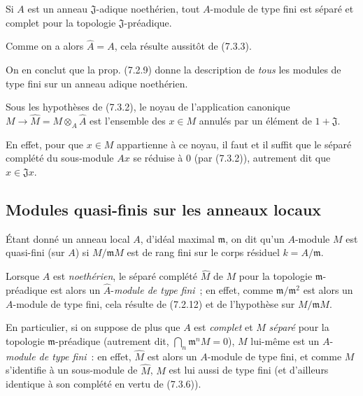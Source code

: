 \begin{corollary}[7.3.6]
\label{0.7.3.6-fr}
Si $A$ est un anneau $\mathfrak J$-adique noethérien, tout $A$-module de type
fini est séparé et complet pour la topologie $\mathfrak J$-préadique.
\end{corollary}

Comme on a alors $\widehat A=A$, cela résulte aussitôt de (7.3.3).

On en conclut que la prop. (7.2.9) donne la description de \emph{tous} les
modules de type fini sur un anneau adique noethérien.

\begin{corollary}[7.3.7]
\label{0.7.3.7-fr}
Sous les hypothèses de \textup{(7.3.2)}, le noyau de l'application canonique
$M\to\widehat M=M\otimes_A\widehat A$ est l'ensemble des $x\in M$ annulés par
un élément de $1+\mathfrak J$.
\end{corollary}

En effet, pour que $x\in M$ appartienne à ce noyau, il faut et il suffit que
le séparé complété du sous-module $Ax$ se réduise à 0 (par (7.3.2)), autrement
dit que $x\in\mathfrak Jx$.

\subsection{Modules quasi-finis sur les anneaux locaux}
\label{subsection:0.7.4-fr}

\begin{definition}[7.4.1]
\label{0.7.4.1-fr}
Étant donné un anneau local $A$, d'idéal maximal $\mathfrak m$, on dit qu'un
$A$-module $M$ est quasi-fini (sur $A$) si $M/\mathfrak mM$ est de rang fini
sur le corps résiduel $k=A/\mathfrak m$.
\end{definition}

Lorsque $A$ est \emph{noethérien}, le séparé complété $\widehat M$ de $M$ pour la
topologie $\mathfrak m$-préadique est alors un
$\widehat A$-\emph{module de type fini}~; en effet, comme
$\mathfrak m/\mathfrak m^2$ est alors un $A$-module de type fini, cela résulte
de (7.2.12) et de l'hypothèse sur $M/\mathfrak mM$.

En particulier, si on suppose de plus que $A$ est \emph{complet} et $M$
\emph{séparé} pour la topologie $\mathfrak m$-préadique (autrement dit,
$\bigcap_n\mathfrak m^nM=0$), $M$ lui-même est un
$A$-\emph{module de type fini}~: en effet, $\widehat M$ est alors un
$A$-module de type fini, et comme $M$ s'identifie à un sous-module de
$\widehat M$, $M$ est lui aussi de type fini (et d'ailleurs identique à son
complété en vertu de (7.3.6)).

